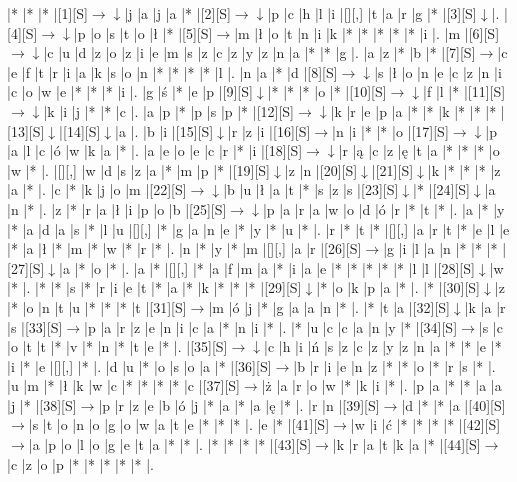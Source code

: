 \documentclass[11pt]{article}
\newcommand\drarr{$\rightarrow \!\!\!\!\! \downarrow$}
\newcommand\rarr{$\rightarrow$}
\newcommand\darr{$\downarrow$}
\begin{document}
\noindent\begin{Puzzle}{21}{26}|*	|*	|*	|[1][S]\drarr	|j	|a	|j	|a	|*	|[2][S]\drarr	|p	|c	|h	|l	|i	|[][,]{ }	|t	|a	|r	|g	|*	|[3][S]\darr	|.
|[4][S]\drarr	|p	|o	|s	|t	|o	|ł	|*	|[5][S]\rarr	|m	|ł	|o	|t	|n	|i	|k	|*	|*	|*	|*	|*	|i	|.
|m	|[6][S]\drarr	|c	|u	|d	|z	|o	|z	|i	|e	|m	|s	|z	|c	|z	|y	|z	|n	|a	|*	|*	|g	|.
|a	|z	|*	|b	|*	|[7][S]\rarr	|c	|e	|f	|t	|r	|i	|a	|k	|s	|o	|n	|*	|*	|*	|*	|l	|.
|n	|a	|*	|d	|[8][S]\drarr	|s	|ł	|o	|n	|e	|c	|z	|n	|i	|c	|o	|w	|e	|*	|*	|*	|i	|.
|g	|ś	|*	|e	|p	|[9][S]\darr	|*	|*	|*	|o	|*	|[10][S]\drarr	|f	|l	|*	|[11][S]\drarr	|k	|i	|j	|*	|*	|c	|.
|a	|p	|*	|p	|s	|p	|*	|[12][S]\drarr	|k	|r	|e	|p	|a	|*	|*	|k	|*	|*	|*	|[13][S]\darr	|[14][S]\darr	|a	|.
|b	|i	|[15][S]\darr	|r	|z	|i	|[16][S]\rarr	|n	|i	|*	|*	|o	|[17][S]\drarr	|p	|a	|l	|c	|ó	|w	|k	|a	|*	|.
|a	|e	|o	|e	|c	|r	|*	|i	|[18][S]\drarr	|r	|ą	|c	|z	|ę	|t	|a	|*	|*	|*	|o	|w	|*	|.
|[][,]{ }	|w	|d	|s	|z	|a	|*	|m	|p	|*	|[19][S]\darr	|z	|n	|[20][S]\darr	|[21][S]\darr	|k	|*	|*	|*	|z	|a	|*	|.
|c	|*	|k	|j	|o	|m	|[22][S]\drarr	|b	|u	|ł	|a	|t	|*	|s	|z	|s	|[23][S]\darr	|*	|[24][S]\darr	|a	|n	|*	|.
|z	|*	|r	|a	|ł	|i	|p	|o	|b	|[25][S]\drarr	|p	|a	|r	|a	|w	|o	|d	|ó	|r	|*	|t	|*	|.
|a	|*	|y	|*	|a	|d	|a	|s	|*	|l	|u	|[][,]{ }	|*	|g	|a	|n	|e	|*	|y	|*	|u	|*	|.
|r	|*	|t	|*	|[][,]{ }	|a	|r	|t	|*	|e	|l	|e	|*	|a	|ł	|*	|m	|*	|w	|*	|r	|*	|.
|n	|*	|y	|*	|m	|[][,]{ }	|a	|r	|[26][S]\rarr	|g	|i	|l	|a	|n	|*	|*	|*	|[27][S]\darr	|a	|*	|o	|*	|.
|a	|*	|[][,]{ }	|*	|a	|f	|m	|a	|*	|i	|a	|e	|*	|*	|*	|*	|*	|l	|l	|[28][S]\darr	|w	|*	|.
|*	|*	|s	|*	|r	|i	|e	|t	|*	|a	|*	|k	|*	|*	|*	|[29][S]\darr	|*	|o	|k	|p	|a	|*	|.
|*	|[30][S]\darr	|z	|*	|o	|n	|t	|u	|*	|*	|*	|t	|[31][S]\rarr	|m	|ó	|j	|*	|g	|a	|a	|n	|*	|.
|*	|t	|a	|[32][S]\darr	|k	|a	|r	|s	|[33][S]\rarr	|p	|a	|r	|z	|e	|n	|i	|c	|a	|*	|n	|i	|*	|.
|*	|u	|c	|c	|a	|n	|y	|*	|[34][S]\rarr	|s	|c	|o	|t	|t	|*	|v	|*	|n	|*	|t	|e	|*	|.
|[35][S]\drarr	|c	|h	|i	|ń	|s	|z	|c	|z	|y	|z	|n	|a	|*	|*	|e	|*	|i	|*	|e	|[][,]{ }	|*	|.
|d	|u	|*	|o	|s	|o	|a	|*	|[36][S]\rarr	|b	|r	|i	|e	|n	|z	|*	|*	|o	|*	|r	|s	|*	|.
|u	|m	|*	|ł	|k	|w	|c	|*	|*	|*	|*	|c	|[37][S]\rarr	|ż	|a	|r	|o	|w	|*	|k	|i	|*	|.
|p	|a	|*	|*	|a	|a	|j	|*	|[38][S]\rarr	|p	|r	|z	|e	|b	|ó	|j	|*	|a	|*	|a	|ę	|*	|.
|r	|n	|[39][S]\rarr	|d	|*	|*	|a	|[40][S]\rarr	|s	|t	|o	|n	|o	|g	|o	|w	|a	|t	|e	|*	|*	|*	|.
|e	|*	|[41][S]\rarr	|w	|i	|ć	|*	|*	|*	|*	|[42][S]\rarr	|a	|p	|o	|l	|o	|g	|e	|t	|a	|*	|*	|.
|*	|*	|*	|*	|[43][S]\rarr	|k	|r	|a	|t	|k	|a	|*	|[44][S]\rarr	|c	|z	|o	|p	|*	|*	|*	|*	|*	|.\end{Puzzle}

\newpage
\end{document}
